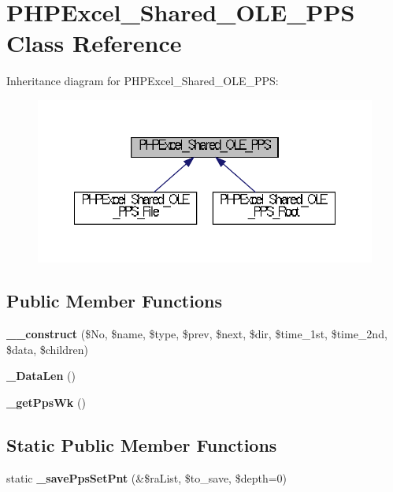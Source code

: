 \section{P\+H\+P\+Excel\+\_\+\+Shared\+\_\+\+O\+L\+E\+\_\+\+P\+P\+S Class Reference}
\label{class_p_h_p_excel___shared___o_l_e___p_p_s}


Inheritance diagram for P\+H\+P\+Excel\+\_\+\+Shared\+\_\+\+O\+L\+E\+\_\+\+P\+P\+S\+:\nopagebreak
\begin{figure}[H]
\begin{center}
\leavevmode
\includegraphics[width=350pt]{class_p_h_p_excel___shared___o_l_e___p_p_s__inherit__graph}
\end{center}
\end{figure}
\subsection*{Public Member Functions}
\begin{DoxyCompactItemize}
\item 
{\bf \+\_\+\+\_\+construct} (\$No, \$name, \$type, \$prev, \$next, \$dir, \$time\+\_\+1st, \$time\+\_\+2nd, \$data, \$children)
\item 
{\bf \+\_\+\+Data\+Len} ()
\item 
{\bf \+\_\+get\+Pps\+Wk} ()
\end{DoxyCompactItemize}
\subsection*{Static Public Member Functions}
\begin{DoxyCompactItemize}
\item 
static {\bf \+\_\+save\+Pps\+Set\+Pnt} (\&\$ra\+List, \$to\+\_\+save, \$depth=0)
\end{DoxyCompactItemize}
